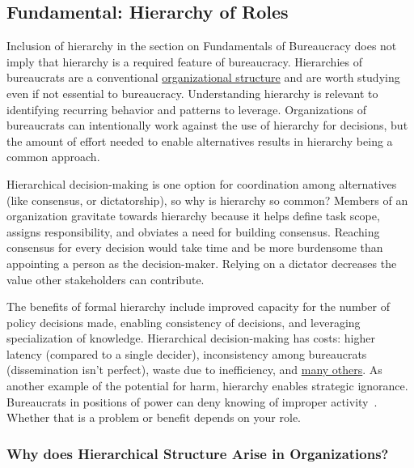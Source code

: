 \subsection*{Fundamental: Hierarchy of Roles\label{sec:hierarchy-of-roles}}

Inclusion of hierarchy in the section on Fundamentals of Bureaucracy does not imply that hierarchy is a required feature of bureaucracy. Hierarchies of bureaucrats are a conventional \href{https://en.wikipedia.org/wiki/Organizational_structure}{organizational structure} 
\iftoggle{WPinmargin}{\marginpar{$>$Wikipedia: Organizational structure}}{}
and are worth studying even if not essential to bureaucracy. Understanding hierarchy is relevant to identifying recurring behavior and patterns to leverage.
Organizations of bureaucrats can intentionally work against the use of hierarchy for decisions, but the amount of effort needed to enable alternatives results in hierarchy being a common approach.


Hierarchical decision-making is one option for coordination among alternatives (like consensus, or dictatorship), so why is hierarchy so common? Members of an organization gravitate towards hierarchy because it helps define task scope, assigns responsibility, and obviates a need for building consensus. Reaching consensus for every decision would take time and be more burdensome than appointing a person as the decision-maker. Relying on a dictator decreases the value other stakeholders can contribute. 


The benefits of formal hierarchy include improved capacity for the number of policy decisions made, enabling consistency of decisions, and leveraging specialization of knowledge. 
Hierarchical decision-making has costs: higher latency (compared to a single decider), inconsistency among bureaucrats (dissemination isn't perfect), waste due to inefficiency, and 
\hyperref[sec:unavoidable-hazards]{many others}.
As another example of the potential for harm, hierarchy enables strategic ignorance. Bureaucrats in positions of power can deny knowing of improper activity~\cite{2019_McGoey, 2012_McGoey}.  Whether that is a problem or benefit depends on your role. 

\subsubsection*{Why does Hierarchical Structure Arise in Organizations?}


